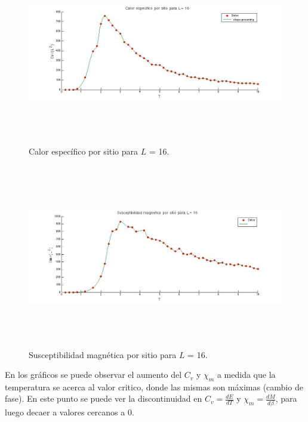 \documentclass[a4paper,12pt]{article}
\begin{document}
\begin{figure}[H]
\begin{center}
\includegraphics[height=8cm,width=20cm]{../graficos/Cv_L16.jpg}
\caption[width=5cm]{Calor espec\'ifico por sitio para $L$ = 16.}
\end{center}
\end{figure}

\begin{figure}[H]
\begin{center}
\includegraphics[height=8cm,width=20cm]{../graficos/Xm_L16.jpg}
\caption[width=5cm]{Susceptibilidad magn\'etica por sitio para $L$ = 16.}
\end{center}
\end{figure}

En los gr\'aficos se puede observar el aumento del $C_{v}$ y $\chi_{m}$ a medida que la temperatura se acerca al valor critico, donde las mismas son m\'aximas (cambio de fase). En este punto se puede ver la discontinuidad en $C_{v} = \frac{dE}{dT}$ y $\chi_{m} = \frac{dM}{d\beta}$, para luego decaer a valores cercanos a 0.
\end{document}
